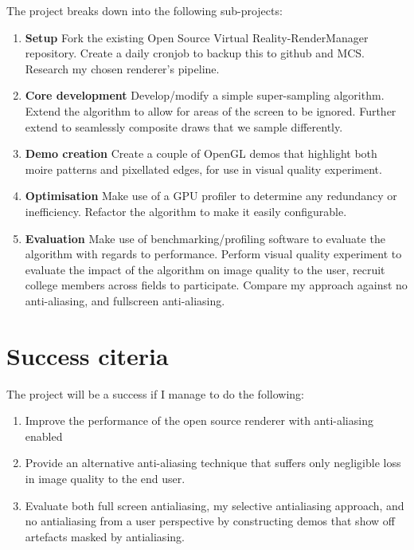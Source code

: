 \documentclass[12pt,a4paper,twoside]{article}
\begin{document}
The project breaks down into the following sub-projects:

\begin{enumerate}

\item \textbf{Setup} Fork the existing Open Source Virtual Reality-RenderManager repository. Create a daily cronjob to backup this to github and MCS. Research my chosen renderer's pipeline.

\item \textbf {Core development} Develop/modify a simple super-sampling algorithm. Extend the algorithm to allow for areas of the screen to be ignored. Further extend to seamlessly composite draws that we sample differently.

\item \textbf {Demo creation} Create a couple of OpenGL demos that highlight both moire patterns and pixellated edges, for use in visual quality experiment.

\item \textbf {Optimisation} Make use of a GPU profiler to determine any redundancy or inefficiency. Refactor the algorithm to make it easily configurable.

\item \textbf {Evaluation} Make use of benchmarking/profiling software to evaluate the algorithm with regards to performance. Perform visual quality experiment to evaluate the impact of the algorithm on image quality to the user, recruit college members across fields to participate. Compare my approach against no anti-aliasing, and fullscreen anti-aliasing.

\end{enumerate}

\section*{Success citeria}

The project will be a success if I manage to do the following:
\begin{enumerate}

\item Improve the performance of the open source renderer with anti-aliasing enabled

\item Provide an alternative anti-aliasing technique that suffers only negligible loss in image quality to the end user.

\item Evaluate both full screen antialiasing, my selective antialiasing approach, and no antialiasing from a user perspective by constructing demos that show off artefacts masked by antialiasing.

\end{enumerate}
\end{document}
